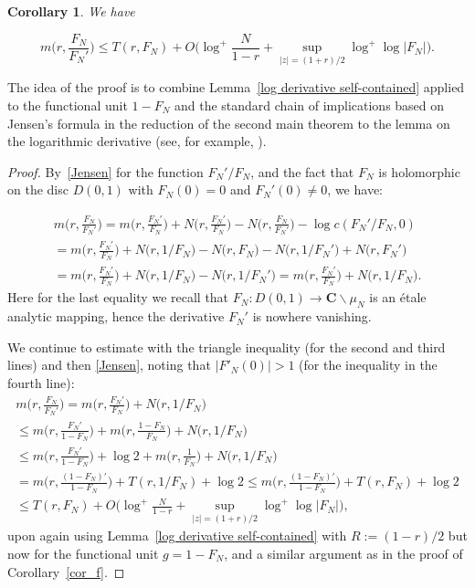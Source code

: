\documentclass[10pt]{amsart}
\renewcommand\setminus{\smallsetminus}
\newtheorem{cor}[subsubsection]{Corollary}
\theoremstyle{remark}
\numberwithin{equation}{subsection}
\def\numequation{\addtocounter{subsubsection}{1}\begin{equation}}
\def\C{\mathbf{C}}
\begin{document}
\begin{cor}   \label{cor_F}
We have 
\numequation \label{second piece}
m\Big( r, \frac{F_N}{F_N'} \Big) \leq  T(r,F_N) + O \Big(   \log^+{\frac{N}{1-r} }  + \sup_{|z| = (1+r)/2}
\log^+{\log{|F_N|}} \Big).
\end{equation}
\end{cor}
The idea of the proof is to combine Lemma~\ref{log derivative self-contained} applied to the functional unit $1-F_N$ and the standard chain of implications based on Jensen's formula in the reduction of the second main theorem to the lemma on the logarithmic derivative (see, for example, \cite[pages 33--34]{Hayman}).
\begin{proof}
By~\eqref{Jensen} for the function $F_N'/F_N$, and the fact that $F_N$
is holomorphic on the disc $D(0,1)$ with $F_N(0)=0$ and $F_N'(0) \neq 0$, we have:
\numequation
\begin{split}
m\Big( r, \frac{F_N}{F_N'} \Big) = m\Big( r, \frac{F_N'}{F_N} \Big) + N\Big( r, \frac{F_N'}{F_N} \Big)
- N\Big( r, \frac{F_N}{F_N'} \Big) - \log{c(F_N'/F_N,0)} \\
= m\Big( r, \frac{F_N'}{F_N} \Big) + N\Big( r, 1/F_N \Big)
- N\Big( r, F_N \Big) -  N\Big( r, 1/F_N' \Big) + N\Big( r, F_N' \Big) \\
\label{Nram}
= m\Big( r, \frac{F_N'}{F_N} \Big) + N\Big( r, 1/F_N \Big) 
 -  N\Big( r, 1/F_N' \Big) 
= m\Big( r, \frac{F_N'}{F_N} \Big) + N\Big( r, 1/F_N \Big).
\end{split}
\end{equation}
Here for the last equality we recall that $F_N : D(0,1) \to \C \setminus \mu_N$ is an \'etale analytic mapping, 
hence the derivative $F_N'$ is nowhere vanishing. 

 We continue to estimate with the triangle inequality (for the second and third lines) and then \eqref{Jensen}, noting that $|F'_N(0)|>1$ (for the inequality in the fourth line):
\begin{equation*}
\begin{split}
 m\Big( r, \frac{F_N}{F_N'} \Big)  = m\Big( r, \frac{F_N'}{F_N} \Big) + N\Big( r, 1/F_N \Big) \\ \nonumber \leq 
m\Big( r, \frac{F_N'}{1-F_N} \Big) + m\Big( r, \frac{1-F_N}{F_N} \Big) + N\Big( r, 1/F_N \Big)\\
\leq m\Big( r, \frac{F_N'}{1-F_N} \Big) + \log 2 + m\Big( r, \frac{1}{F_N} \Big) + N\Big( r, 1/F_N \Big)\\
=m\Big( r, \frac{(1-F_N)'}{1-F_N} \Big) + T(r, 1/F_N) + \log 2
\leq m\Big( r, \frac{(1-F_N)'}{1-F_N} \Big) + T(r, F_N) + \log 2 \\
\leq  T(r,F_N) + O \Big(   \log^+{\frac{N}{1-r} }  + \sup_{|z| = (1+r)/2}
\log^+{\log{|F_N|}} \Big),
\end{split}
\end{equation*}
upon again using Lemma~\ref{log derivative self-contained} with $R := (1-r)/2$ but now for the  functional unit
$g = 1-F_N$, and a similar argument as in the proof of Corollary~\ref{cor_f}.
\end{proof}
\end{document}
